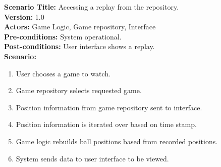 \documentclass[letterpaper,12pt]{article}
\begin{document}
\noindent \textbf{Scenario Title:} Accessing a replay from the repository.\\
\textbf{Version:} 1.0\\
\textbf{Actors:} Game Logic, Game repository, Interface\\
\textbf{Pre-conditions:} System operational.\\
\textbf{Post-conditions:} User interface shows a replay.\\
\textbf{Scenario:}
\begin{enumerate}
\item User chooses a game to watch.
\item Game repository selects requested game.
\item Position information from game repository sent to interface.
\item Position information is iterated over based on time stamp.
\item Game logic rebuilds ball positions based from recorded positions.
\item System sends data to user interface to be viewed.
\end{enumerate}
\end{document}
